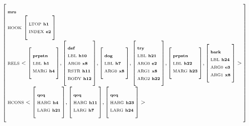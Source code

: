 \documentclass[12pt]{article}
\newcommand{\avmplus}[1]{{\setlength{\arraycolsep}{0.8mm}	
                       \renewcommand{\arraystretch}{1.1} %
                       \left[ 			
                       \begin{array}{l}
                       \\[-2mm] #1 \\[-2mm] \\
                       \end{array} 		
                       \right]
                    }}
\newcommand{\att}[1]{{\mbox{\scriptsize {\bf #1}}}}
\newcommand{\attval}[2]{{\mbox{\scriptsize #1}\ {{#2}}}}
\newcommand{\attvallist}[2]{{\mbox{\scriptsize #1}\ {<{#2}>}}}
\newcommand{\attvaltyp}[2]{{\mbox{\scriptsize #1}\ {\myvaluebold{#2}}}}
\newcommand{\myvaluebold}[1]{{\mbox{\scriptsize {\bf #1}}}}
\begin{document}
\vbox{
\enumsentence{\label{csem}
}
\noindent
{\small
$\avmplus{\att{mrs}\\
          \attval{HOOK}{\avmplus{\attvaltyp{LTOP}{h1}\\
                                 \attvaltyp{INDEX}{e2}}}\\
          \attvallist{RELS}{
\avmplus{\att{prpstn}\\
         \attvaltyp{LBL}{h1}\\
         \attvaltyp{MARG}{h4}},
\avmplus{\att{def}\\
         \attvaltyp{LBL}{h10}\\
         \attvaltyp{ARG0}{x8}\\
         \attvaltyp{RSTR}{h11}\\
         \attvaltyp{BODY}{h12}},
\avmplus{\att{dog}\\
         \attvaltyp{LBL}{h7}\\
         \attvaltyp{ARG0}{x8}},
\avmplus{\att{try}\\
         \attvaltyp{LBL}{h21}\\
         \attvaltyp{ARG0}{e2}\\
         \attvaltyp{ARG1}{x8}\\
         \attvaltyp{ARG2}{h22}},
\avmplus{\att{prpstn}\\
         \attvaltyp{LBL}{h22}\\
         \attvaltyp{MARG}{h23}},
\avmplus{\att{bark}\\
         \attvaltyp{LBL}{h24}\\
         \attvaltyp{ARG0}{e3}\\
         \attvaltyp{ARG1}{x8}}}\\
\attvallist{HCONS}{
    \avmplus{\att{qeq}\\
             \attvaltyp{HARG}{h4}\\
             \attvaltyp{LARG}{h21}},
    \avmplus{\att{qeq}\\
             \attvaltyp{HARG}{h11}\\
             \attvaltyp{LARG}{h7}},
    \avmplus{\att{qeq}\\
             \attvaltyp{HARG}{h23}\\
             \attvaltyp{LARG}{h24}}}}$}
}
\end{document}
